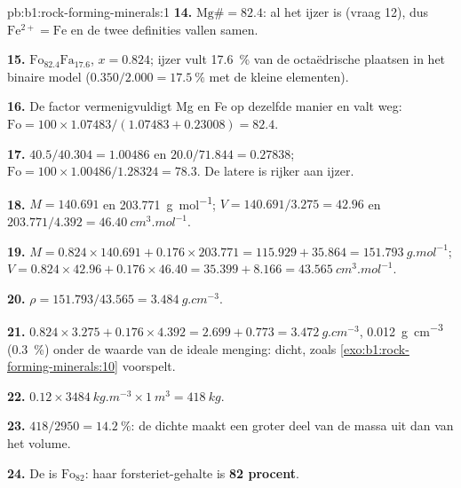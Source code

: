 \begin{solution}{pb:b1:rock-forming-minerals:1}
\textbf{14.} $\mathrm{Mg\#} = 82.4$: al het ijzer is 
(vraag 12), dus $\mathrm{Fe^{2+}} = \mathrm{Fe}$ en de twee definities
vallen samen.

\textbf{15.} $\text{Fo}_{82.4}\text{Fa}_{17.6}$, $x = 0.824$; ijzer vult
\qty{17.6}{\percent} van de octaëdrische plaatsen in het binaire model
($0.350/2.000 = \qty{17.5}{\percent}$ met de kleine elementen).

\textbf{16.} De factor vermenigvuldigt Mg en Fe op dezelfde manier en valt weg:
$\mathrm{Fo} = 100\times1.07483/(1.07483 + 0.23008) = 82.4$.

\textbf{17.} $40.5/40.304 = 1.00486$ en $20.0/71.844 = 0.27838$;
$\mathrm{Fo} = 100\times1.00486/1.28324 = 78.3$. De latere  is rijker aan
ijzer.

\textbf{18.} $M = 140.691$ en \qty{203.771}{g.mol^{-1}};
$V = 140.691/3.275 = 42.96$ en $203.771/4.392 =
\qty{46.40}{cm^3.mol^{-1}}$.

\textbf{19.} $M = 0.824\times140.691 + 0.176\times203.771 = 115.929 +
35.864 = \qty{151.793}{g.mol^{-1}}$; $V = 0.824\times42.96 +
0.176\times46.40 = 35.399 + 8.166 = \qty{43.565}{cm^3.mol^{-1}}$.

\textbf{20.} $\rho = 151.793/43.565 = \qty{3.484}{g.cm^{-3}}$.

\textbf{21.} $0.824\times3.275 + 0.176\times4.392 = 2.699 + 0.773 =
\qty{3.472}{g.cm^{-3}}$, \qty{0.012}{g.cm^{-3}} (\qty{0.3}{\percent}) onder de
waarde van de ideale menging: dicht, zoals \cref{exo:b1:rock-forming-minerals:10}
voorspelt.

\textbf{22.} $0.12\times\qty{3484}{kg.m^{-3}}\times\qty{1}{m^3} =
\qty{418}{kg}$.

\textbf{23.} $418/2950 = \qty{14.2}{\percent}$: de dichte  maakt een
groter deel van de massa uit dan van het volume.

\textbf{24.} De  is $\text{Fo}_{82}$: haar forsteriet-gehalte is
\textbf{82 procent}.
\end{solution}
